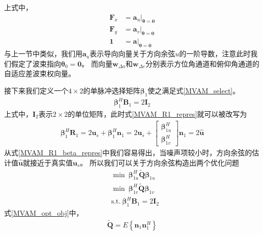 \documentclass[master]{thesis-uestc}
\begin{document}
上式中，
\begin{subequations}
    \begin{align}
        \bm{F}_x &= \bm{a}_u|_{\bm{\theta}=\textbf{0}} \\
        \bm{F}_y &= \bm{a}_v|_{\bm{\theta}=\textbf{0}} \\
        \textbf{1} &= \bm{a}|_{\bm{\theta}=\textbf{0}}
    \end{align}
\end{subequations}
与上一节中类似，我们用$\bm{a}_u$表示导向向量关于方向余弦$u$的一阶导数，注意此时我们假定了波束指向$\bm{\theta}_0=\textbf{0}$。
而向量$\bm{w}_{\Delta a}$和$\bm{w}_{\Delta e}$分别表示方位角通道和俯仰角通道的自适应差波束权向量。

接下来我们定义一个$4\times2$的单脉冲选择矩阵$\bm{\beta}_1$使之满足式\eqref{MVAM_select}。
\begin{equation}\label{MVAM_select}
    \begin{aligned}
        \bm{\beta}_1^H\bm{B}_1=2\bm{I}_2
    \end{aligned}
\end{equation}
上式中，$\bm{I}_2$表示$2\times2$的单位矩阵，此时式\eqref{MVAM_R1_repres}就可以被改写为
\begin{equation}\label{MVAM_R1_beta_repres}
    \begin{aligned}
        \bm{\beta}^H_1\bm{R}_1 = 2\bm{u}_s + \bm{\beta}^H_1\bm{n}_1
        = 2\bm{u}_s + 
        \begin{bmatrix}
            \bm{\beta}_{1u}^H \\ \bm{\beta}_{1v}^H
        \end{bmatrix}
        \bm{n}_1 = 2\hat{\bm{u}}
    \end{aligned}
\end{equation}
从式\eqref{MVAM_R1_beta_repres}中我们容易得出，当噪声项较小时，方向余弦的估计值$\hat{\bm{u}}$就接近于真实值$\bm{u}_s$。
所以我们可以关于方向余弦构造出两个优化问题
\begin{equation}\label{MVAM_opt_obj}
    \begin{aligned}
        &\min ~ \bm{\beta}_{1u}^H\tilde{\bm{Q}}\bm{\beta}_{1u} \\
        &\min ~ \bm{\beta}_{1v}^H\tilde{\bm{Q}}\bm{\beta}_{1v} \\
        &\text{s.t.} ~ \bm{\beta}_1^H\bm{B}_1=2\bm{I}_2
    \end{aligned}
\end{equation}
式\eqref{MVAM_opt_obj}中，
\begin{equation}
    \begin{aligned}
        \tilde{\bm{Q}}=E\left\{\bm{n}_1\bm{n}_1^H\right\}
    \end{aligned}
\end{equation}
\end{document}
